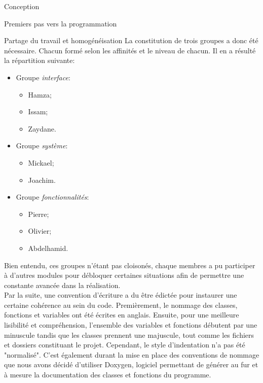 \documentclass[a4paper, 12pt]{report}
\begin{document}
\begin{part}{Conception}
\begin{chapter}{Premiers pas vers la programmation}
\begin{section}{Partage du travail et homogénéisation}
				La constitution de trois groupes a donc été nécessaire. Chacun formé selon les 
				affinités et le niveau de chacun. Il en a résulté la répartition suivante:\\
				\begin{itemize}
					\item Groupe \emph{interface}:
						\begin{itemize}
							\item Hamza;
							\item Issam;
							\item Zaydane.
						\end{itemize}
				\end{itemize}
				\begin{itemize}
					\item Groupe \emph{système}:
					\begin{itemize}
						\item Mickael;
						\item Joachim.
					\end{itemize}
				\end{itemize}
				\begin{itemize}
					\item Groupe \emph{fonctionnalités}:
					\begin{itemize}
						\item Pierre;
						\item Olivier;
						\item Abdelhamid.
					\end{itemize}
				\end{itemize}
				Bien entendu, ces groupes n'étant pas cloisonés, chaque membres a pu participer à d'autres modules pour débloquer certaines
				situations afin de permettre une constante avancée dans la réalisation.\\
				Par la suite, une convention d'écriture a du être édictée pour instaurer une certaine cohérence au sein du code.
				Premièrement, le nommage des classes, fonctions et variables ont été écrites en anglais. 
				Ensuite, pour une meilleure lisibilité et compréhension, l'ensemble des variables et fonctions débutent par une minuscule tandis
				que les classes prennent une majuscule, tout comme les fichiers et dossiers constituant le projet.
				Cependant, le style d'indentation n'a pas été "normalisé". C'est également durant la mise en place des conventions de
				nommage que nous avons décidé d'utiliser Doxygen, logiciel permettant de générer au fur et à mesure la documentation des classes
				et fonctions du programme.\\

\end{section}
\end{chapter}
\end{part}
\end{document}
